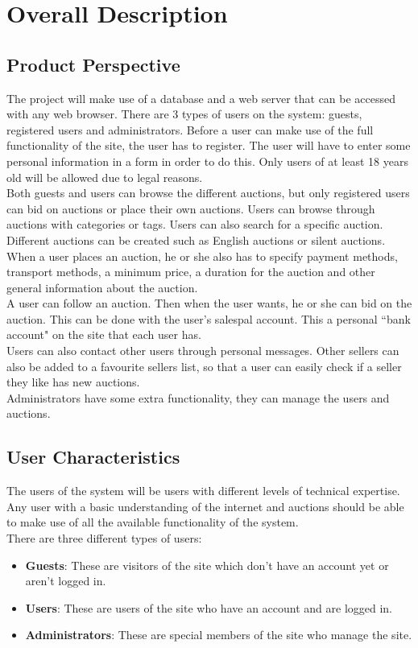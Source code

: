 \chapter{Overall Description}

\section{Product Perspective}
	The project will make use of a database and a web server that can be 
	accessed with any web browser. There are 3 types of users on the system:
	guests, registered users and administrators. Before a user can make use
	of the full functionality of the site, the user has to register. The user
	will have to enter some personal information in a form in order to do this.
	Only users of at least 18 years old will be allowed due to legal reasons.\\
	Both guests and users can browse the different auctions, but only registered 
	users can bid on auctions or place their own auctions. Users can browse through
	auctions with categories or tags. Users can also search for a  specific auction.\\
	Different auctions can be created such as English auctions\cite{English} or
	silent auctions\cite{silent}. When a user places an auction, he or she also has to specify
	payment methods, transport methods, a minimum price, a duration for the auction
	and other general information about the auction.\\
	A user can follow an auction. Then when the user wants, he or she can bid on the auction.
	This can be done with the user's salespal account. This a personal ``bank account" on
	the site that each user has. \\
	Users can also contact other users through personal messages. Other sellers can also
	be added to a favourite sellers list, so that a user can easily check if a 
	seller they like has new auctions. \\
	Administrators have some extra functionality, they can manage the users 
	and auctions.
\section{User Characteristics}
	The users of the system will be users with different levels of 
	technical expertise. Any user with a basic understanding of the 
	internet and auctions should be able to make use of all the 
	available functionality of the system.\\
	There are three different types of users:
	\begin{itemize}
		\item \textbf{Guests}: These are visitors of the site which don't 
		have an account yet or aren't logged in.
		\item \textbf{Users}: These are users of the site who have an 
		account and are logged in.
		\item \textbf{Administrators}: These are special members of the 
		site who manage the site.
	\end{itemize}

